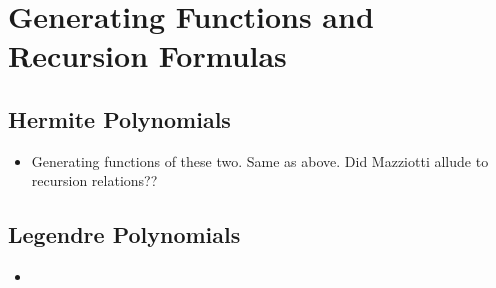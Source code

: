 \documentclass[../finalProject.tex]{subfiles}
\begin{document}
\section{Generating Functions and Recursion Formulas}
\subsection{Hermite Polynomials}
\begin{itemize}
    \item {}Generating functions of these two. Same as above. Did Mazziotti allude to recursion relations??
\end{itemize}


\setcounter{subsection}{3}
\subsection{Legendre Polynomials}
\begin{itemize}
    \item 
\end{itemize}
\end{document}
